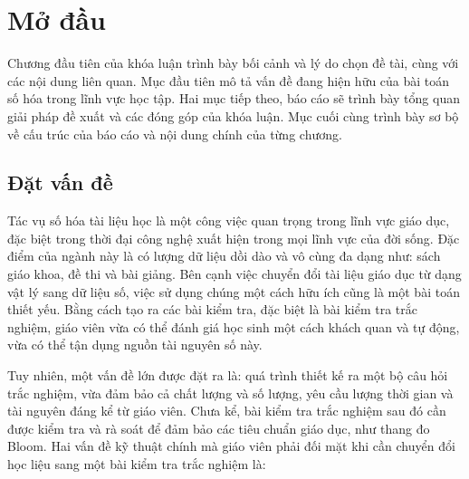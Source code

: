 

\chapter{Mở đầu}
\label{chap:mo-dau}

Chương đầu tiên của khóa luận trình bày bối cảnh và lý do chọn đề tài, cùng với các nội dung liên quan. Mục đầu tiên mô tả vấn đề đang hiện hữu của bài toán số hóa trong lĩnh vực học tập. Hai mục tiếp theo, báo cáo sẽ trình bày tổng quan giải pháp đề xuất và các đóng góp của khóa luận. Mục cuối cùng trình bày sơ bộ về cấu trúc của báo cáo và nội dung chính của từng chương.

\section{Đặt vấn đề}

Tác vụ số hóa tài liệu học là một công việc quan trọng trong lĩnh vực giáo dục, đặc biệt trong thời đại công nghệ xuất hiện trong mọi lĩnh vực của đời sống. Đặc điểm của ngành này là có lượng dữ liệu dồi dào và vô cùng đa dạng như: sách giáo khoa, đề thi và bài giảng. Bên cạnh việc chuyển đổi tài liệu giáo dục từ dạng vật lý sang dữ liệu số, việc sử dụng chúng một cách hữu ích cũng là một bài toán thiết yếu. Bằng cách tạo ra các bài kiểm tra, đặc biệt là bài kiểm tra trắc nghiệm, giáo viên vừa có thể đánh giá học sinh một cách khách quan và tự động, vừa có thể tận dụng nguồn tài nguyên số này.

Tuy nhiên, một vấn đề lớn được đặt ra là: quá trình thiết kế ra một bộ câu hỏi trắc nghiệm, vừa đảm bảo cả chất lượng và số lượng, yêu cầu lượng thời gian và tài nguyên đáng kể từ giáo viên. Chưa kể, bài kiểm tra trắc nghiệm sau đó cần được kiểm tra và rà soát để đảm bảo các tiêu chuẩn giáo dục, như thang đo Bloom. Hai vấn đề kỹ thuật chính mà giáo viên phải đối mặt khi cần chuyển đổi học liệu sang một bài kiểm tra trắc nghiệm là:

